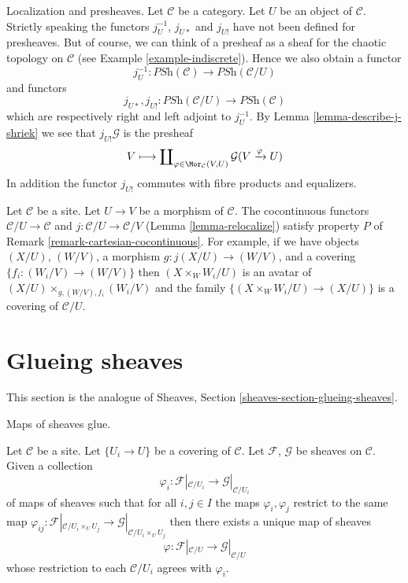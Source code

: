 \begin{remark}
\label{remark-localize-presheaves}
Localization and presheaves. Let $\mathcal{C}$ be a category.
Let $U$ be an object of $\mathcal{C}$. Strictly speaking the functors
$j_U^{-1}$, $j_{U*}$ and $j_{U!}$ have not been defined for presheaves.
But of course, we can think of a presheaf as a sheaf for the
chaotic topology on $\mathcal{C}$ (see Example \ref{example-indiscrete}).
Hence we also obtain a functor
$$
j_U^{-1} :
\textit{PSh}(\mathcal{C})
\longrightarrow
\textit{PSh}(\mathcal{C}/U)
$$
and functors
$$
j_{U*}, j_{U!} :
\textit{PSh}(\mathcal{C}/U)
\longrightarrow
\textit{PSh}(\mathcal{C})
$$
which are respectively right and left adjoint to $j_U^{-1}$. By
Lemma \ref{lemma-describe-j-shriek}
we see that $j_{U!}\mathcal{G}$ is the presheaf
$$
V \longmapsto
\coprod\nolimits_{\varphi \in \Mor_\mathcal{C}(V, U)}
\mathcal{G}(V \xrightarrow{\varphi} U)
$$
In addition the functor $j_{U!}$ commutes with fibre products and
equalizers.
\end{remark}

\begin{remark}
\label{remark-localization-cartesian-cocontinuous}
Let $\mathcal{C}$ be a site. Let $U \to V$ be a morphism of $\mathcal{C}$.
The cocontinuous functors $\mathcal{C}/U \to \mathcal{C}$ and
$j : \mathcal{C}/U \to \mathcal{C}/V$ (Lemma \ref{lemma-relocalize})
satisfy property $P$ of Remark \ref{remark-cartesian-cocontinuous}.
For example, if we have objects $(X/U)$, $(W/V)$, a morphism
$g : j(X/U) \to (W/V)$, and a covering $\{f_i  : (W_i/V) \to (W/V)\}$ then
$(X \times_W W_i/U)$ is an avatar of $(X/U) \times_{g, (W/V), f_i} (W_i/V)$
and the family $\{(X \times_W W_i/U) \to (X/U)\}$ is a covering
of $\mathcal{C}/U$.
\end{remark}






\section{Glueing sheaves}
\label{section-glueing-sheaves}

\noindent
This section is the analogue of
Sheaves, Section \ref{sheaves-section-glueing-sheaves}.

\begin{lemma}
\label{lemma-glue-maps}
\begin{slogan}
Maps of sheaves glue.
\end{slogan}
Let $\mathcal{C}$ be a site.
Let $\{U_i \to U\}$ be a covering of $\mathcal{C}$.
Let $\mathcal{F}$, $\mathcal{G}$ be sheaves on $\mathcal{C}$.
Given a collection
$$
\varphi_i :
\mathcal{F}|_{\mathcal{C}/U_i}
\longrightarrow
\mathcal{G}|_{\mathcal{C}/U_i}
$$
of maps of sheaves such that for all $i, j \in I$ the maps
$\varphi_i, \varphi_j$ restrict to the same map
$\varphi_{ij} : \mathcal{F}|_{\mathcal{C}/U_i \times_U U_j} \to
\mathcal{G}|_{\mathcal{C}/U_i \times_U U_j}$
then there exists a unique map of sheaves
$$
\varphi :
\mathcal{F}|_{\mathcal{C}/U}
\longrightarrow
\mathcal{G}|_{\mathcal{C}/U}
$$
whose restriction to each $\mathcal{C}/U_i$ agrees with $\varphi_i$.
\end{lemma}

